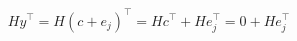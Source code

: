 \documentclass[preview]{standalone}
\begin{document}
\begin{align*}
Hy^\top = H(c+e_j)^\top = Hc^\top + He_j^\top = 0 + He_j^\top
\end{align*}
\end{document}
